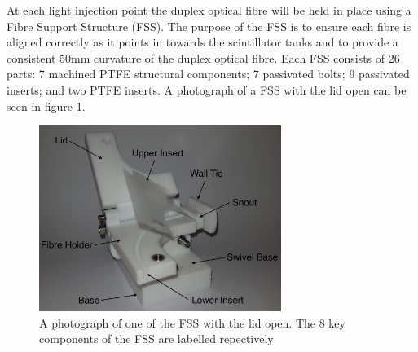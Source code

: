 At each light injection point the duplex optical fibre will be held in place using a Fibre Support Structure (FSS). The purpose of the FSS is to ensure each fibre is aligned correctly as it points in towards the scintillator tanks and to provide a consistent 50mm curvature of the duplex optical fibre. Each FSS consists of 26 parts: 7 machined PTFE structural components; 7 passivated bolts; 9 passivated inserts; and two PTFE inserts. A photograph of a FSS with the lid open can be seen in figure \ref{fig:FFS}.

\begin{figure}[h]
    \centering
    \includegraphics[width=0.7\textwidth, angle=0]{Figures/FSS.jpg}
    \caption{A photograph of one of the FSS with the lid open. The 8 key components of the FSS are labelled repectively}
    \label{fig:FFS}
\end{figure}

